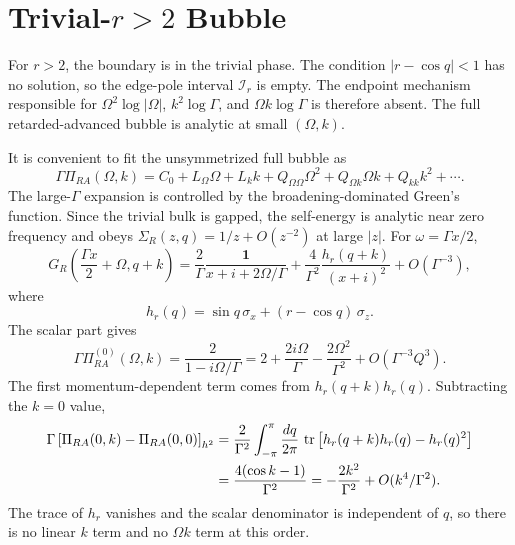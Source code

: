 \documentclass[aps,prx,preprint,amsmath,amssymb]{revtex4-2}
\newcommand{\tr}{{\rm \, tr\,}}
\begin{document}
\section{Trivial-\texorpdfstring{$r>2$}{r>2} Bubble}
\label{sec:trivial-r-bubble}

For \(r>2\), the boundary is in the trivial phase.  The condition
\(|r-\cos q|<1\) has no solution, so the edge-pole interval
\(\mathcal I_r\) is empty.  The endpoint mechanism responsible for
\(\Omega^2\log|\Omega|\), \(k^2\log\Gamma\), and
\(\Omega k\log\Gamma\) is therefore absent.  The full retarded-advanced bubble
is analytic at small \((\Omega,k)\).

It is convenient to fit the unsymmetrized full bubble as
\begin{equation}
\label{eq:trivial-fit-def}
\Gamma\Pi_{RA}(\Omega,k)
=
C_0
+L_\Omega\Omega
+L_k k
+Q_{\Omega\Omega}\Omega^2
+Q_{\Omega k}\Omega k
+Q_{kk}k^2
+\cdots .
\end{equation}
The large-\(\Gamma\) expansion is controlled by the broadening-dominated Green's
function.  Since the trivial bulk is gapped, the self-energy is analytic near
zero frequency and obeys \(\Sigma_R(z,q)=1/z+O(z^{-2})\) at large \(|z|\).
For \(\omega=\Gamma x/2\),
\begin{equation}
G_R\!\left(\frac{\Gamma x}{2}+\Omega,q+k\right)
=
\frac{2}{\Gamma}\frac{\mathbf{1}}{x+i+2\Omega/\Gamma}
+
\frac{4}{\Gamma^2}\frac{h_r(q+k)}{(x+i)^2}
+O(\Gamma^{-3}),
\end{equation}
where
\[
h_r(q)=\sin q\,\sigma_x+(r-\cos q)\,\sigma_z.
\]
The scalar part gives
\begin{equation}
\label{eq:trivial-scalar-expansion}
\Gamma\Pi_{RA}^{(0)}(\Omega,k)
=
\frac{2}{1-i\Omega/\Gamma}
=
2+\frac{2i\Omega}{\Gamma}
-\frac{2\Omega^2}{\Gamma^2}
+O(\Gamma^{-3}Q^3).
\end{equation}
The first momentum-dependent term comes from \(h_r(q+k)h_r(q)\).  Subtracting
the \(k=0\) value,
\begin{align}
\Gamma\left[\Pi_{RA}(0,k)-\Pi_{RA}(0,0)\right]_{h^2}
&=
\frac{2}{\Gamma^2}
\int_{-\pi}^{\pi}\frac{dq}{2\pi}\,
\tr\!\left[h_r(q+k)h_r(q)-h_r(q)^2\right]
\notag\\
&=
\frac{4(\cos k-1)}{\Gamma^2}
=
-\frac{2k^2}{\Gamma^2}+O(k^4/\Gamma^2).
\label{eq:trivial-k2-derivation}
\end{align}
The trace of \(h_r\) vanishes and the scalar denominator is independent of
\(q\), so there is no linear \(k\) term and no \(\Omega k\) term at this order.
\end{document}
